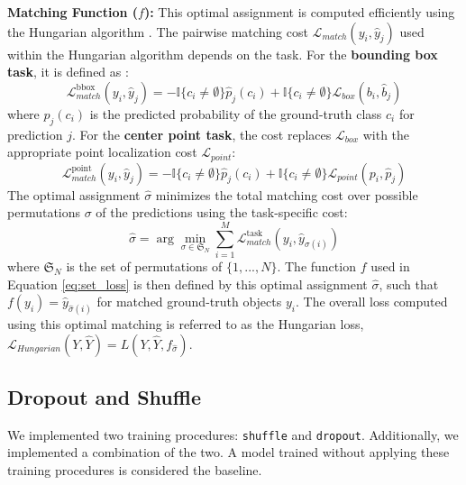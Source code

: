 \textbf{Matching Function ($ f $):} This optimal assignment is computed efficiently using the Hungarian algorithm \cite{Kuhn1955TheHM, Carion2020EndToEndOD, Stewart2015EndtoendPD}. The pairwise matching cost $\mathcal{L}_{match}(y_i, \hat{y}_j)$ used within the Hungarian algorithm depends on the task. For the \textbf{bounding box task}, it is defined as \cite{Carion2020EndToEndOD}:
\begin{equation} \label{eq:matching_cost_bbox}
\mathcal{L}_{match}^{\text{bbox}}(y_i, \hat{y}_j) = - \mathbb{I}\{c_i \neq \emptyset\} \hat{p}_{j}(c_i) + \mathbb{I}\{c_i \neq \emptyset\} \mathcal{L}_{box}(b_i, \hat{b}_{j})
\end{equation}
where $\hat{p}_j(c_i)$ is the predicted probability of the ground-truth class $c_i$ for prediction $j$. For the \textbf{center point task}, the cost replaces $\mathcal{L}_{box}$ with the appropriate point localization cost $\mathcal{L}_{point}$:
\begin{equation} \label{eq:matching_cost_point}
\mathcal{L}_{match}^{\text{point}}(y_i, \hat{y}_j) = - \mathbb{I}\{c_i \neq \emptyset\} \hat{p}_{j}(c_i) + \mathbb{I}\{c_i \neq \emptyset\} \mathcal{L}_{point}(p_i, \hat{p}_{j})
\end{equation}
The optimal assignment $\hat{\sigma}$ minimizes the total matching cost over possible permutations $\sigma$ of the predictions using the task-specific cost:
\begin{equation} \label{eq:hungarian_argmin}
\hat{\sigma} = \arg\min_{\sigma \in \mathfrak{S}_N} \sum_{i=1}^{M} \mathcal{L}_{match}^{\text{task}}(y_i, \hat{y}_{\sigma(i)})
\end{equation}
where $\mathfrak{S}_N$ is the set of permutations of $\{1, ..., N\}$. The function $f$ used in Equation \ref{eq:set_loss} is then defined by this optimal assignment $\hat{\sigma}$, such that $f(y_i) = \hat{y}_{\hat{\sigma}(i)}$ for matched ground-truth objects $y_i$. The overall loss computed using this optimal matching is referred to as the Hungarian loss, $\mathcal{L}_{Hungarian}(Y, \hat{Y}) = L(Y, \hat{Y}, f_{\hat{\sigma}})$.

\subsection{Dropout and Shuffle} \label{Methods:Training:DropoutAndShuffle}

We implemented two training procedures: \texttt{shuffle} and \texttt{dropout}. Additionally, we implemented a combination of the two. A model trained without applying these training procedures is considered the baseline.

